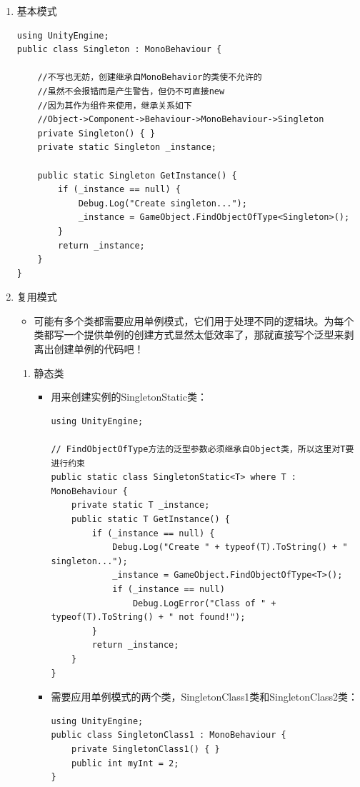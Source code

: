 \documentclass[9pt, b5paper]{article}
\begin{document}
\begin{enumerate}
\item 基本模式
\label{sec:org4d1f2b8}
\begin{verbatim}
using UnityEngine;
public class Singleton : MonoBehaviour {
    
    //不写也无妨，创建继承自MonoBehavior的类使不允许的
    //虽然不会报错而是产生警告，但仍不可直接new
    //因为其作为组件来使用，继承关系如下
    //Object->Component->Behaviour->MonoBehaviour->Singleton
    private Singleton() { }
    private static Singleton _instance;
    
    public static Singleton GetInstance() {
        if (_instance == null) {
            Debug.Log("Create singleton...");
            _instance = GameObject.FindObjectOfType<Singleton>();
        }
        return _instance;
    }
}
\end{verbatim}
\item 复用模式
\label{sec:orgb1a55a6}
\begin{itemize}
\item 可能有多个类都需要应用单例模式，它们用于处理不同的逻辑块。为每个类都写一个提供单例的创建方式显然太低效率了，那就直接写个泛型来剥离出创建单例的代码吧！
\end{itemize}
\begin{enumerate}
\item 静态类
\label{sec:org98df38d}
\begin{itemize}
\item 用来创建实例的SingletonStatic类：
\begin{verbatim}
using UnityEngine;

// FindObjectOfType方法的泛型参数必须继承自Object类，所以这里对T要进行约束 
public static class SingletonStatic<T> where T : MonoBehaviour {
    private static T _instance;
    public static T GetInstance() {
        if (_instance == null) {
            Debug.Log("Create " + typeof(T).ToString() + " singleton...");
            _instance = GameObject.FindObjectOfType<T>();
            if (_instance == null)
                Debug.LogError("Class of " + typeof(T).ToString() + " not found!");
        }
        return _instance;
    }
}
\end{verbatim}
\item 需要应用单例模式的两个类，SingletonClass1类和SingletonClass2类：
\begin{verbatim}
using UnityEngine;
public class SingletonClass1 : MonoBehaviour {
    private SingletonClass1() { }
    public int myInt = 2;
}


\end{verbatim}
\end{itemize}
\end{enumerate}
\end{enumerate}
\end{document}
